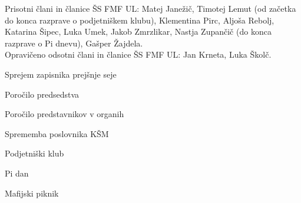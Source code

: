 \documentclass{seja}
\begin{document}
Prisotni člani in članice ŠS FMF UL:
Matej Janežič,
Timotej Lemut (od začetka do konca razprave o podjetniškem klubu),
Klementina Pirc,
Aljoša Rebolj,
Katarina Šipec,
Luka Umek,
Jakob Zmrzlikar,
Nastja Zupančič (do konca razprave o Pi dnevu),
Gašper Žajdela.
\\
Opravičeno odsotni člani in članice ŠS FMF UL: Jan Krneta, Luka Školč.

\begin{red*}
	\item
	Sprejem zapisnika prejšnje seje
	\item
	Poročilo predsedstva
	\item
	Poročilo predstavnikov v organih
    \item
    Sprememba poslovnika KŠM
    \item
    Podjetniški klub 
    \item
    Pi dan
    \item
    Mafijski piknik

\end{red*}
\end{document}
